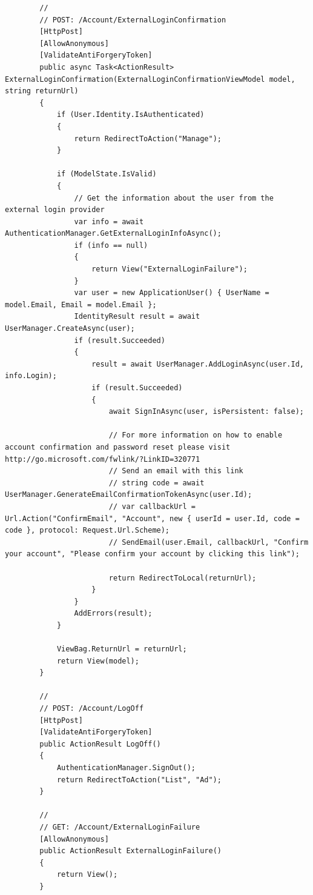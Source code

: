 \documentclass[14pt,a4paper]{extreport}
\begin{document}
\begin{lstlisting}
        //
        // POST: /Account/ExternalLoginConfirmation
        [HttpPost]
        [AllowAnonymous]
        [ValidateAntiForgeryToken]
        public async Task<ActionResult> ExternalLoginConfirmation(ExternalLoginConfirmationViewModel model, string returnUrl)
        {
            if (User.Identity.IsAuthenticated)
            {
                return RedirectToAction("Manage");
            }

            if (ModelState.IsValid)
            {
                // Get the information about the user from the external login provider
                var info = await AuthenticationManager.GetExternalLoginInfoAsync();
                if (info == null)
                {
                    return View("ExternalLoginFailure");
                }
                var user = new ApplicationUser() { UserName = model.Email, Email = model.Email };
                IdentityResult result = await UserManager.CreateAsync(user);
                if (result.Succeeded)
                {
                    result = await UserManager.AddLoginAsync(user.Id, info.Login);
                    if (result.Succeeded)
                    {
                        await SignInAsync(user, isPersistent: false);
                        
                        // For more information on how to enable account confirmation and password reset please visit http://go.microsoft.com/fwlink/?LinkID=320771
                        // Send an email with this link
                        // string code = await UserManager.GenerateEmailConfirmationTokenAsync(user.Id);
                        // var callbackUrl = Url.Action("ConfirmEmail", "Account", new { userId = user.Id, code = code }, protocol: Request.Url.Scheme);
                        // SendEmail(user.Email, callbackUrl, "Confirm your account", "Please confirm your account by clicking this link");
                        
                        return RedirectToLocal(returnUrl);
                    }
                }
                AddErrors(result);
            }

            ViewBag.ReturnUrl = returnUrl;
            return View(model);
        }

        //
        // POST: /Account/LogOff
        [HttpPost]
        [ValidateAntiForgeryToken]
        public ActionResult LogOff()
        {
            AuthenticationManager.SignOut();
            return RedirectToAction("List", "Ad");
        }

        //
        // GET: /Account/ExternalLoginFailure
        [AllowAnonymous]
        public ActionResult ExternalLoginFailure()
        {
            return View();
        }


\end{lstlisting}
\end{document}
